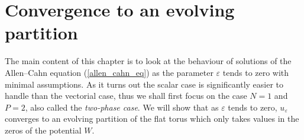 \chapter{Convergence to an evolving partition}
\label{chapter_convergence_to_evolving_partition}

The main content of this chapter is to look at the behaviour of solutions of 
the Allen--Cahn equation (\ref{allen_cahn_eq}) as the parameter $ \varepsilon $ 
tends to zero with minimal assumptions. As it turns out the scalar case is 
significantly easier to handle than the vectorial case, thus we shall first 
focus on the case $ N = 1 $ and $ P = 2 $,
also called the \emph{two-phase case}. We will show that as $ \varepsilon $ 
tends to zero, $ u_{ \varepsilon } $ converges to an evolving partition of the 
flat torus which only takes values in the zeros of the potential $ W $. 






